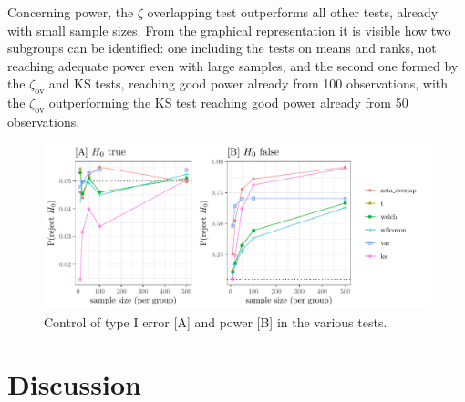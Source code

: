 \documentclass[twocolumn]{article}\usepackage[]{graphicx}\usepackage[]{xcolor}
\makeatletter
\def\maxwidth{ %
  \ifdim\Gin@nat@width>\linewidth
    \linewidth
  \else
    \Gin@nat@width
  \fi
}
\newenvironment{knitrout}{}{} %
\makeatother
\begin{document}
Concerning power, the $\zeta$ overlapping test outperforms all other tests, already with small sample sizes. From the graphical representation it is visible how two subgroups can be identified: one including the tests on means and ranks, not reaching adequate power even with large samples, and the second one formed by the $\zeta_{\mbox{ov}}$ and KS tests, reaching good power already from 100 observations, with the $\zeta_{\mbox{ov}}$ outperforming the KS test reaching good power already from 50 observations.


\begin{figure}[!h]
\begin{knitrout}
\color{fgcolor}

{\centering \includegraphics[width=\maxwidth]{figure/global-1} 

}


\end{knitrout}
\caption{Control of type I error [A] and power [B] in the various tests.\label{fig:global}}
\end{figure}



\section{Discussion}

% 
% 
\end{document}

